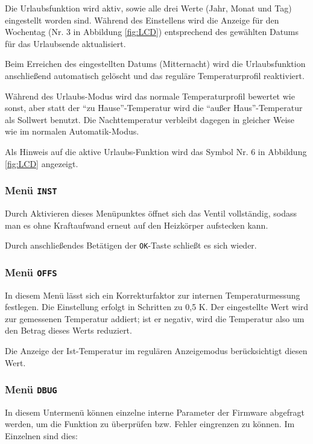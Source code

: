\documentclass[a5paper,twoside]{article}
\begin{document}
Die Urlaubsfunktion wird aktiv, sowie alle drei Werte (Jahr, Monat
und Tag) eingestellt worden sind.  Während des Einstellens wird
die Anzeige für den Wochentag (Nr. 3 in Abbildung \ref{fig:LCD}) entsprechend
des gewählten Datums für das Urlaubsende aktualisiert.

Beim Erreichen des eingestellten Datums (Mitternacht) wird die
Urlaubsfunktion anschließend automatisch gelöscht und das reguläre
Temperaturprofil reaktiviert.

Während des Urlaubs-Modus wird das normale Temperaturprofil bewertet
wie sonst, aber statt der "`zu Hause"'-Temperatur wird die "`außer
Haus"'-Temperatur als Sollwert benutzt.  Die Nachttemperatur
verbleibt dagegen in gleicher Weise wie im normalen Automatik-Modus.

Als Hinweis auf die aktive Urlaubs-Funktion wird das Symbol Nr. 6
in Abbildung \ref{fig:LCD} angezeigt.

\subsubsection {
  Menü \texttt{INST}
}

Durch Aktivieren dieses Menüpunktes öffnet sich das Ventil
vollständig, sodass man es ohne Kraftaufwand erneut auf
den Heizkörper aufstecken kann.

Durch anschließendes Betätigen der \texttt{OK}-Taste schließt
es sich wieder.

\subsubsection {
  Menü \texttt{OFFS}
}

In diesem Menü lässt sich ein Korrekturfaktor zur internen
Temperaturmessung festlegen.  Die Einstellung erfolgt in Schritten zu
0,5 K.  Der eingestellte Wert wird zur gemessenen Temperatur addiert;
ist er negativ, wird die Temperatur also um den Betrag dieses Werts
reduziert.

Die Anzeige der Ist-Temperatur im regulären Anzeigemodus
berücksichtigt diesen Wert.

\subsubsection {
  Menü \texttt{DBUG}
}

In diesem Untermenü können einzelne interne Parameter der Firmware
abgefragt werden, um die Funktion zu überprüfen bzw. Fehler eingrenzen
zu können.  Im Einzelnen sind dies:
\end{document}
